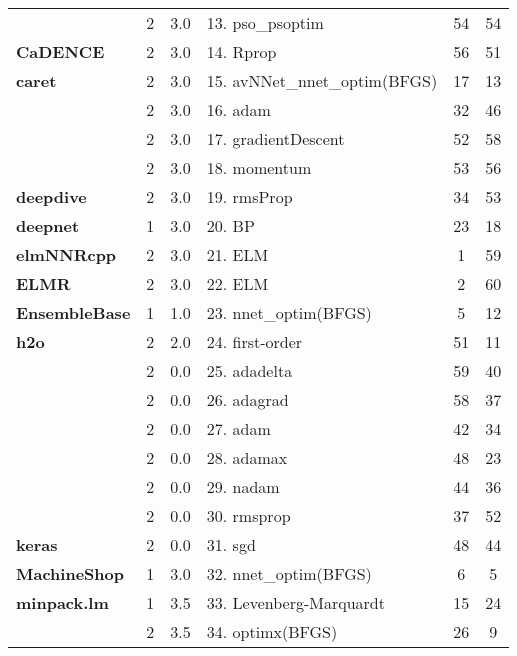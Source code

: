 \begin{Schunk}
\begin{table}
\begin{tabular}[t]{>{}lcclcc}
 & 2 & 3.0 & 13. pso\_psoptim & 54 & 54\\

\multirow{-3}{*}{\raggedright\arraybackslash \textbf{CaDENCE}} & 2 & 3.0 & 14. Rprop & 56 & 51\\
\cmidrule{1-6}
\textbf{caret} & 2 & 3.0 & 15. avNNet\_nnet\_optim(BFGS) & 17 & 13\\
\cmidrule{1-6}
 & 2 & 3.0 & 16. adam & 32 & 46\\

 & 2 & 3.0 & 17. gradientDescent & 52 & 58\\

 & 2 & 3.0 & 18. momentum & 53 & 56\\

\multirow{-4}{*}{\raggedright\arraybackslash \textbf{deepdive}} & 2 & 3.0 & 19. rmsProp & 34 & 53\\
\cmidrule{1-6}
\textbf{deepnet} & 1 & 3.0 & 20. BP & 23 & 18\\
\cmidrule{1-6}
\textbf{elmNNRcpp} & 2 & 3.0 & 21. ELM & 1 & 59\\
\cmidrule{1-6}
\textbf{ELMR} & 2 & 3.0 & 22. ELM & 2 & 60\\
\cmidrule{1-6}
\textbf{EnsembleBase} & 1 & 1.0 & 23. nnet\_optim(BFGS) & 5 & 12\\
\cmidrule{1-6}
\textbf{h2o} & 2 & 2.0 & 24. first-order & 51 & 11\\
\cmidrule{1-6}
 & 2 & 0.0 & 25. adadelta & 59 & 40\\

 & 2 & 0.0 & 26. adagrad & 58 & 37\\

 & 2 & 0.0 & 27. adam & 42 & 34\\

 & 2 & 0.0 & 28. adamax & 48 & 23\\

 & 2 & 0.0 & 29. nadam & 44 & 36\\

 & 2 & 0.0 & 30. rmsprop & 37 & 52\\

\multirow{-7}{*}{\raggedright\arraybackslash \textbf{keras}} & 2 & 0.0 & 31. sgd & 48 & 44\\
\cmidrule{1-6}
\textbf{MachineShop} & 1 & 3.0 & 32. nnet\_optim(BFGS) & 6 & 5\\
\cmidrule{1-6}
\textbf{minpack.lm} & 1 & 3.5 & 33. Levenberg-Marquardt & 15 & 24\\
\cmidrule{1-6}
 & 2 & 3.5 & 34. optimx(BFGS) & 26 & 9\\


\end{tabular}
\end{table}
\end{Schunk}
